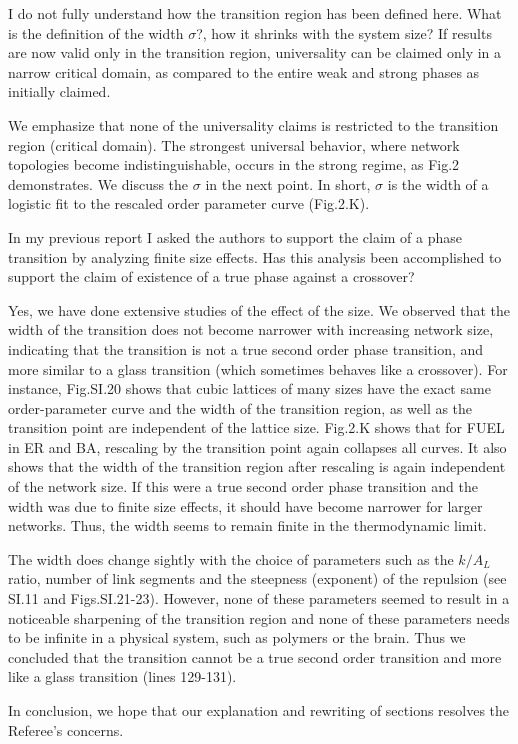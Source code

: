 \documentclass[11pt]{article}
\begin{document}
\begin{response}{
I do not fully understand how the transition region has been defined here. 
What is the definition of the width $\sigma$?, how it shrinks with the system size? If results are now valid only in the transition region, universality can be 
claimed only in a narrow critical domain, as compared to the entire weak and 
strong phases as initially claimed. 
}

We emphasize that none of the universality claims is restricted to the transition region (critical domain). 
The strongest universal behavior, where network topologies become indistinguishable, occurs in the strong regime, as Fig.2 demonstrates.
We discuss the $\sigma$ in the next point. 
In short, $\sigma$ is the width of a logistic fit to the rescaled order parameter curve (Fig.2.K).

\end{response}
\begin{response}{

In my previous report I asked the authors to support the claim of a phase transition by analyzing finite size effects. 
Has this analysis been accomplished to support the claim of existence of a true phase against a crossover? 

}
Yes, we have done extensive studies of the effect of the size. 
We observed that the width of the transition does not become narrower with increasing network size, indicating that the transition is not a true second order phase transition, and more similar to a glass transition {\color{red}(which sometimes behaves like a crossover)}.
For instance, Fig.SI.20 shows that cubic lattices of many sizes have the exact same order-parameter curve and the width of the transition region, as well as the transition point are independent of the lattice size. 
Fig.2.K shows that for FUEL in ER and BA, rescaling by the transition point again collapses all curves. 
It also shows that the width of the transition region after rescaling is again independent of the network size. 
If this were a true second order phase transition and the width was due to finite size effects, it should have become narrower for larger networks. 
Thus, the width seems to remain finite in the thermodynamic limit.

The width does change sightly with the choice of parameters such as the $k/A_L$ ratio, number of link segments and the steepness (exponent) of the repulsion (see SI.11 and Figs.SI.21-23). 
However, none of these parameters seemed to result in a noticeable sharpening of the transition region and none of these parameters needs to be infinite in a physical system, such as polymers or the brain. 
Thus we concluded that the transition cannot be a true second order transition and more like a glass transition (lines 129-131).

\end{response}


In conclusion, we hope that our explanation and rewriting of sections resolves the Referee's concerns.  


\end{document}
